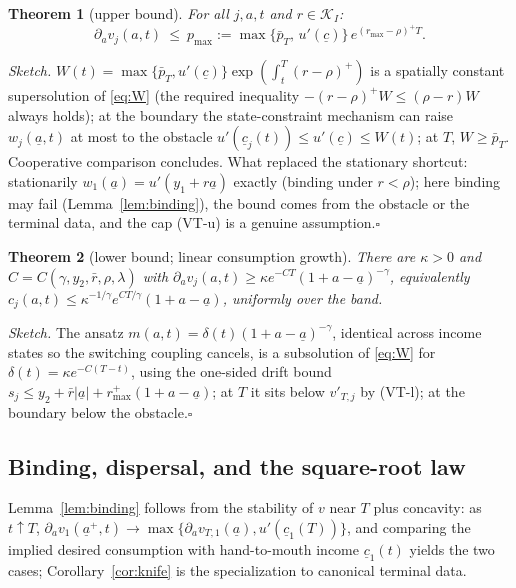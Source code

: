 \documentclass[11pt]{article}
\newtheorem{theorem}{Theorem}[section]
\theoremstyle{definition}
\theoremstyle{remark}
\newcommand{\ubar}[1]{\underline{#1}}
\newcommand{\Kcal}{\mathcal{K}}
\newcommand{\ubc}{\ubar{c}}
\newcommand{\uba}{\ubar{a}}
\begin{document}
\begin{theorem}[upper bound]\label{thm:upper}
For all $j,a,t$ and $r\in\Kcal_I$:
\[
\partial_a v_j(a,t)\ \le\ p_{\max}
:=\max\{\bar p_T,\,u'(\ubc)\}\,e^{(r_{\max}-\rho)^+T}.
\]
\end{theorem}

\emph{Sketch.} $W(t)=\max\{\bar p_T,u'(\ubc)\}
\exp(\int_t^T(r-\rho)^+)$ is a spatially constant supersolution of
\eqref{eq:W} (the required inequality $-(r-\rho)^+W\le(\rho-r)W$
always holds); at the boundary the state-constraint mechanism can
raise $w_j(\uba,t)$ at most to the obstacle
$u'(\ubc_j(t))\le u'(\ubc)\le W(t)$; at $T$, $W\ge\bar p_T$.
Cooperative comparison concludes. What replaced the stationary
shortcut: stationarily $w_1(\uba)=u'(y_1+r\uba)$ exactly (binding
under $r<\rho$); here binding may fail
(Lemma~\ref{lem:binding}), the bound comes from the obstacle or the
terminal data, and the cap (VT-u) is a genuine
assumption.\hfill$\square$

\begin{theorem}[lower bound; linear consumption growth]
\label{thm:lower}
There are $\kappa>0$ and $C=C(\gamma,y_2,\bar r,\rho,\lambda)$ with
$\partial_a v_j(a,t)\ge\kappa e^{-CT}(1+a-\uba)^{-\gamma}$,
equivalently $c_j(a,t)\le\kappa^{-1/\gamma}e^{CT/\gamma}(1+a-\uba)$,
uniformly over the band.
\end{theorem}

\emph{Sketch.} The ansatz $m(a,t)=\delta(t)(1+a-\uba)^{-\gamma}$,
identical across income states so the switching coupling cancels, is
a subsolution of \eqref{eq:W} for $\delta(t)=\kappa e^{-C(T-t)}$,
using the one-sided drift bound $s_j\le y_2+\bar
r|\uba|+r^+_{\max}(1+a-\uba)$; at $T$ it sits below $v'_{T,j}$ by
(VT-l); at the boundary below the obstacle.\hfill$\square$

\subsection{Binding, dispersal, and the square-root law}

Lemma~\ref{lem:binding} follows from the stability of $v$ near $T$
plus concavity: as $t\uparrow T$,
$\partial_a v_1(\uba^+,t)\to\max\{\partial_a
v_{T,1}(\uba),u'(\ubc_1(T))\}$, and comparing the implied desired
consumption with hand-to-mouth income $\ubc_1(t)$ yields the two
cases; Corollary~\ref{cor:knife} is the specialization to canonical
terminal data.
\end{document}
